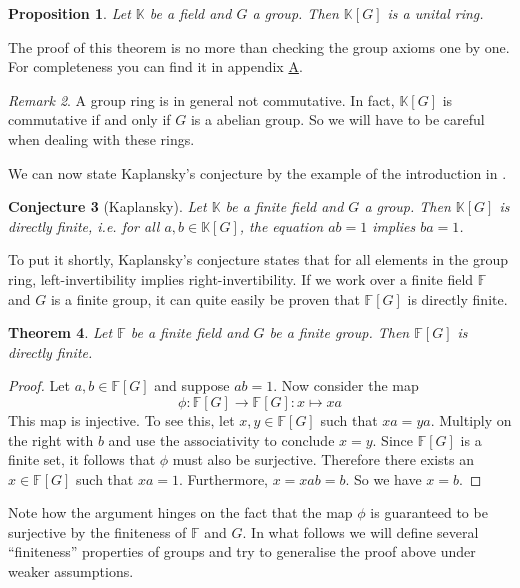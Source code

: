 \documentclass[titlepage, a4paper]{article}
\newcommand{\F}{\mathbb{F}}
\theoremstyle{theoremdd}
\newtheorem{theorem}{Theorem}[section]
\newtheorem{proposition}[theorem]{Proposition}
\newtheorem{conjecture}[theorem]{Conjecture}
\theoremstyle{definition}
\theoremstyle{remark}
\newtheorem{remark}[theorem]{Remark}
\begin{document}
\begin{proposition}
    Let $\mathbb K$ be a field and $G$ a group. Then $\mathbb K[G]$ is a unital ring.
\end{proposition}
The proof of this theorem is no more than checking the group axioms one by one. For completeness you can find it in appendix \hyperlink{sec:proof_groupring}{A}.

\begin{remark}
	A group ring is in general not commutative. In fact, $\mathbb{K}[G]$ is commutative if and only if $G$ is a abelian group. So we will have to be careful when dealing with these rings. 
\end{remark}

We can now state Kaplansky's conjecture by the example of the introduction in \cite{elek_szabo_2003}.

\begin{conjecture}[Kaplansky]
	Let $\mathbb K$ be a finite field and $G$ a group. Then $\mathbb K[G]$ is directly finite, i.e. for all $a, b \in \mathbb K[G]$, the equation $ab=1$ implies $ba=1$.
\end{conjecture}

To put it shortly, Kaplansky's conjecture states that for all elements in the group ring, left-invertibility implies right-invertibility. If we work over a finite field $\F$ and $G$ is a finite group, it can quite easily be proven that $\F[G]$ is directly finite.

\begin{theorem}
    Let $\F$ be a finite field and $G$ be a finite group. Then $\F[G]$ is directly finite. 
\end{theorem}
\begin{proof}
    Let $a, b \in \mathbb F[G]$ and suppose $ab=1$. Now consider the map
    \[
        \phi: \mathbb F[G] \to \mathbb F[G]: x \mapsto x a
    \]
    This map is injective. To see this, let $x, y \in \mathbb F[G]$ such that $xa=ya$. Multiply on the right with $b$ and use the associativity to conclude $x=y$.
    Since $\mathbb F[G]$ is a finite set, it follows that $\phi$ must also be surjective. Therefore there exists an $x \in \mathbb F[G]$ such that $x a = 1$. Furthermore, $x = xab = b$. So we have $x = b$.
\end{proof}

Note how the argument hinges on the fact that the map $\phi$ is guaranteed to be surjective by the finiteness of $\mathbb F$ and $G$. In what follows we will define several ``finiteness'' properties of groups and try to generalise the proof above under weaker assumptions.
\end{document}
